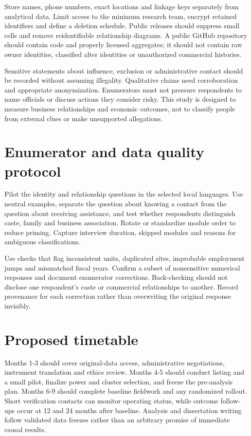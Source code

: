 \documentclass[11pt,a4paper]{report}
\begin{document}
Store names, phone numbers, exact locations and linkage keys separately from analytical data. Limit access to the minimum research team, encrypt retained identifiers and define a deletion schedule. Public releases should suppress small cells and remove reidentifiable relationship diagrams. A public GitHub repository should contain code and properly licensed aggregates; it should not contain raw owner identities, classified alter identities or unauthorized commercial histories.

Sensitive statements about influence, exclusion or administrative contact should be recorded without assuming illegality. Qualitative claims need corroboration and appropriate anonymization. Enumerators must not pressure respondents to name officials or discuss actions they consider risky. This study is designed to measure business relationships and economic outcomes, not to classify people from external clues or make unsupported allegations.

\section{Enumerator and data quality protocol}
Pilot the identity and relationship questions in the selected local languages. Use neutral examples, separate the question about knowing a contact from the question about receiving assistance, and test whether respondents distinguish caste, family and business association. Rotate or standardize module order to reduce priming. Capture interview duration, skipped modules and reasons for ambiguous classifications.

Use checks that flag inconsistent units, duplicated sites, improbable employment jumps and mismatched fiscal years. Confirm a subset of nonsensitive numerical responses and document enumerator corrections. Back-checking should not disclose one respondent's caste or commercial relationships to another. Record provenance for each correction rather than overwriting the original response invisibly.

\section{Proposed timetable}
Months 1-3 should cover original-data access, administrative negotiations, instrument translation and ethics review. Months 4-5 should conduct listing and a small pilot, finalize power and cluster selection, and freeze the pre-analysis plan. Months 6-9 should complete baseline fieldwork and any randomized rollout. Short verification contacts can monitor operating status, while outcome follow-ups occur at 12 and 24 months after baseline. Analysis and dissertation writing follow validated data freezes rather than an arbitrary promise of immediate causal results.
\end{document}
